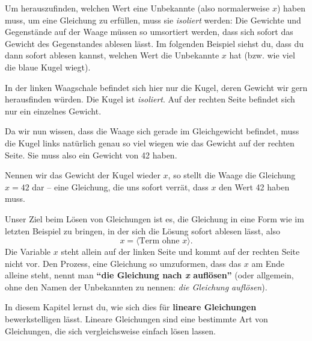 \documentclass[../../main.tex]{subfiles}
\begin{document}
Um herauszufinden, welchen Wert eine Unbekannte (also normalerweise $x$) haben muss, um eine Gleichung zu erfüllen, muss sie \emph{isoliert} werden: Die Gewichte und Gegenstände auf der Waage müssen so umsortiert werden, dass sich sofort das Gewicht des Gegenstandes ablesen lässt. Im folgenden Beispiel siehst du, dass du dann sofort ablesen kannst, welchen Wert die Unbekannte $x$ hat (bzw. wie viel die blaue Kugel wiegt).

\begin{example}{}
    
    In der linken Waagschale befindet sich hier nur die Kugel, deren Gewicht wir gern herausfinden würden. Die Kugel ist \emph{isoliert}. Auf der rechten Seite befindet sich nur ein einzelnes Gewicht.
    
    Da wir nun wissen, dass die Waage sich gerade im Gleichgewicht befindet, muss die Kugel links natürlich genau so viel wiegen wie das Gewicht auf der rechten Seite. Sie muss also ein Gewicht von 42 haben.
    
    Nennen wir das Gewicht der Kugel wieder $x$, so stellt die Waage die Gleichung $x=42$ dar -- eine Gleichung, die uns sofort verrät, dass $x$ den Wert 42 haben muss.
\end{example}

Unser Ziel beim Lösen von Gleichungen ist es, die Gleichung in eine Form wie im letzten Beispiel zu bringen, in der sich die Lösung sofort ablesen lässt, also
\[x=\langle\text{Term ohne } x\rangle.\]
Die Variable $x$ steht allein auf der linken Seite und kommt auf der rechten Seite nicht vor. Den Prozess, eine Gleichung so umzuformen, dass das $x$ am Ende alleine steht, nennt man \textbf{\enquote{die Gleichung nach \emph{x} auflösen}} (oder allgemein, ohne den Namen der Unbekannten zu nennen: \emph{die Gleichung auflösen}). 

In diesem Kapitel lernst du, wie sich dies für \textbf{lineare Gleichungen} bewerkstelligen lässt. Lineare Gleichungen sind eine bestimmte Art von Gleichungen, die sich vergleichsweise einfach lösen lassen.
\end{document}

